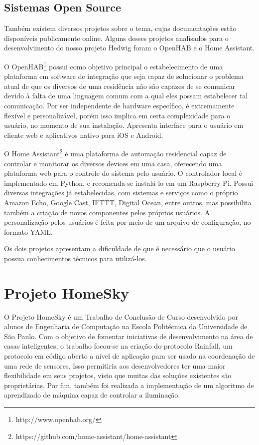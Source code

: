 \subsection{Sistemas Open Source}
Também existem diversos projetos  sobre o tema, cujas documentações estão disponíveis publicamente online. Alguns desses projetos analisados para o desenvolvimento do nosso projeto Hedwig foram o OpenHAB e o Home Assistant.

O OpenHAB\footnote{http://www.openhab.org/} possui como objetivo principal o estabelecimento de uma plataforma em software de integração que seja capaz de solucionar o problema atual de que os diversos  de uma residência não são capazes de se comunicar devido à falta de uma linguagem comum com a qual eles possam estabelecer tal comunicação. Por ser independente de hardware específico, é extremamente flexível e personalizável, porém isso implica em certa complexidade para o usuário, no momento de sua instalação. Apresenta interface para o usuário em cliente web e aplicativos nativo para iOS e Android.

O Home Assistant\footnote{https://github.com/home-assistant/home-assistant} é uma plataforma de automação residencial capaz de controlar e monitorar os diversos devices em uma casa, oferecendo uma plataforma web para o controle do sistema pelo usuário. O controlador local é implementado em Python, e recomenda-se instalá-lo em um Raspberry Pi. Possui diversas integrações já estabelecidas, com sistemas e serviços como o próprio Amazon Echo, Google Cast, IFTTT, Digital Ocean, entre outros, mas possibilita também a criação de novos componentes pelos próprios usuários. A personalização pelos usuários é feita por meio de um arquivo de configuração, no formato YAML.

Os dois projetos apresentam a dificuldade de que é necessário que o usuário possua conhecimentos técnicos para utilizá-los.

\section{Projeto HomeSky}

O Projeto HomeSky \cite{homeSky} é um Trabalho de Conclusão de Curso desenvolvido por alunos de Engenharia de Computação na Escola Politécnica da Universidade de São Paulo. Com o objetivo de fomentar iniciativas de desenvolvimento na área de casas inteligentes, o trabalho focou-se na criação do protocolo Rainfall, um protocolo em código aberto a nível de aplicação para ser usado na coordenação de uma rede de sensores. Isso permitiria aos desenvolvedores ter uma maior flexibilidade em seus projetos, visto que muitas das soluções existentes são proprietárias. Por fim, também foi realizada a implementação de um algoritmo de aprendizado de máquina capaz de controlar a iluminação.

